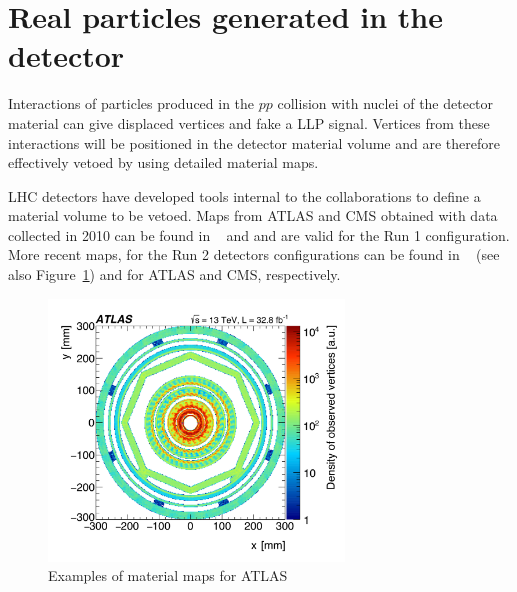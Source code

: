 \section{Real particles generated in the detector} %

Interactions of particles produced in the $pp$ collision with nuclei of the detector material can give displaced vertices and fake a LLP signal. Vertices from these interactions will be positioned in the detector material volume and are therefore effectively vetoed by using detailed material maps.

LHC detectors have developed tools internal to the collaborations to define a material volume to be vetoed. Maps from ATLAS and CMS obtained with data collected in 2010 can be found in ~\cite{Aaboud:2016poq} and \cite{CMS:2010nua} and are valid for the Run 1 configuration. More recent maps, for the Run 2 detectors configurations can be found in ~\cite{Aaboud:2017iio} (see also Figure~\ref{fig:materialmaps}) and \cite{CMSmaterial} for ATLAS and CMS, respectively.

\begin{figure}[h]
  \centering
  \includegraphics[width=0.7\textwidth]{figures/atlasmaterial.png}
  \caption{Examples of material maps for ATLAS~\cite{Aaboud:2017iio}
  }
  \label{fig:materialmaps}
\end{figure}

